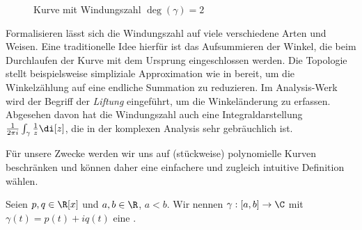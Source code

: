 \documentclass{mythesis}
\begin{document}
\begin{figure}[ht]
    \centering
    \caption{Kurve mit Windungszahl $\deg(\gamma) = 2$}
    \label{fig:winding_number}
\end{figure}

Formalisieren lässt sich die Windungszahl auf viele verschiedene Arten und Weisen.
Eine traditionelle Idee hierfür ist das Aufsummieren der Winkel, die beim Durchlaufen der Kurve mit dem Ursprung eingeschlossen werden.
Die Topologie stellt beispielsweise simpliziale Approximation wie in \cite[§I1f,§I1h]{eiserm_topology} bereit, um die Winkelzählung auf eine endliche Summation zu reduzieren.
Im Analysis-Werk \cite[§12.7]{koenigsberger1} wird der Begriff der \emph{Liftung} eingeführt, um die Winkeländerung zu erfassen.
Abgesehen davon hat die Windungszahl auch eine Integraldarstellung $\frac{1}{2\pi i} \int_{\gamma} \frac{1}{z} \di[z]$, die in der komplexen Analysis sehr gebräuchlich ist.

Für unsere Zwecke werden wir uns auf (stückweise) polynomielle Kurven beschränken und können daher eine einfachere und zugleich intuitive Definition wählen.

\begin{definition}
    Seien $p, q \in \R[x]$ und $a, b \in \R$, $a < b$.
    Wir nennen $\gamma: [a, b] \to \C$ mit $\gamma(t) = p(t) + iq(t)$ eine .
\end{definition}
\end{document}
